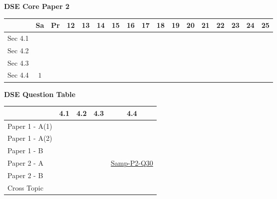 \documentclass[12pt, a4paper]{article}
\begin{document}
\begin{absolutelynopagebreak}
\begin{center}
\textbf{DSE Core Paper 2}
\end{center}
\begin{center}
\begin{tabular}{|l|c|c|c|c|c|c|c|c|c|c|c|c|c|c|c|c|}
\hline
        & Sa & Pr & 12 & 13 & 14 & 15 & 16 & 17 & 18 & 19 & 20 & 21 & 22 & 23 & 24 & 25 \\\hline\hline
Sec 4.1 &  &  &  &  &  &  &  &  &  &  &  &  &  &  &  &  \\\hline
Sec 4.2 &  &  &  &  &  &  &  &  &  &  &  &  &  &  &  &  \\\hline
Sec 4.3 &  &  &  &  &  &  &  &  &  &  &  &  &  &  &  &  \\\hline
Sec 4.4 &  $1$ &  &  &  &  &  &  &  &  &  &  &  &  &  &  &  \\\hline
\end{tabular}
\end{center}
\end{absolutelynopagebreak}
\begin{absolutelynopagebreak}
\begin{center}
\textbf{DSE Question Table}
\end{center}
\begin{center}
\begin{tabular}{|l|c|c|c|c|}
\hline
        & 4.1 & 4.2 & 4.3 & 4.4 \\\hline
\hline
Paper 1 - A(1)&  &  &  &  \\
\hline
Paper 1 - A(2)&  &  &  &  \\
\hline
Paper 1 - B&  &  &  &  \\
\hline
\hline
Paper 2 - A&  &  &  & \hyperref[DSE2012S-CoreP2-Q30]{Samp-P2-Q30} \\
\hline
Paper 2 - B&  &  &  &  \\
\hline
\hline
Cross Topic&  &  &  &  \\
\hline
\end{tabular}
\end{center}
\end{absolutelynopagebreak}
\end{document}
